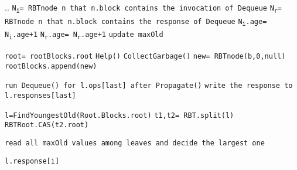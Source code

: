 \documentclass[10pt]{article}
\theoremstyle{definition}
\begin{document}
\begin{algorithm}
\begin{algorithmic}[1]
\begin{multicols}{2}
\Statex

\State ..
\State \texttt{N\textsubscript{i}= RBTnode n that n.block contains the invocation of Dequeue}
\State \texttt{N\textsubscript{r}= RBTnode n that n.block contains the response of Dequeue}
\State \texttt{N\textsubscript{i}.age= N\textsubscript{i}.age+1} 
\State \texttt{N\textsubscript{r}.age= N\textsubscript{r}.age+1}
 \texttt{update maxOld}
\EndIf
{}


\pagebreak


 
\State \texttt{root= rootBlocks.root}
\State \texttt{Help()}
\State \texttt{CollectGarbage()}
\EndIf
\State \texttt{new= RBTnode(b,0,null)}
\State \Return \texttt{rootBlocks.append(new)}
\Statex


\State\texttt{run \texttt{Dequeue()}  for \texttt{l.ops[last]} after Propagate()}
\State \texttt{write the response to l.responses[last]}
\EndIf
\EndIf
\EndFor
{}
\Statex

\State \texttt{l=FindYoungestOld(Root.Blocks.root)}
\State \texttt{t1,t2= RBT.split(l)}
\State \texttt{RBTRoot.CAS(t2.root)}

\Statex

\State\Return  \texttt{read all maxOld values among leaves and decide the largest one} 

\Statex



\State \Return \texttt{l.response[i]}
\EndIf


\end{multicols}
\end{algorithmic}
\end{algorithm}
\end{document}
